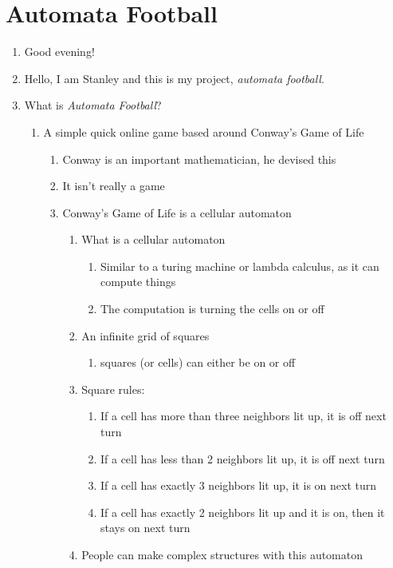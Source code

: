 \documentclass[11pt]{article}
\author{leeyman}
\date{\today}
\title{}
\begin{document}
\tableofcontents

\section{Automata Football}
\label{sec:org928f8e5}
\begin{enumerate}
\item Good evening!
\item Hello, I am Stanley and this is my project, \emph{automata football}.
\item What is \emph{Automata Football}?
\begin{enumerate}
\item A simple quick online game based around Conway's Game of Life
\begin{enumerate}
\item Conway is an important mathematician, he devised this
\item It isn't really a game
\item Conway's Game of Life is a cellular automaton
\begin{enumerate}
\item What is a cellular automaton
\begin{enumerate}
\item Similar to a turing machine or lambda calculus, as it can compute things
\item The computation is turning the cells on or off
\end{enumerate}
\item An infinite grid of squares
\begin{enumerate}
\item squares (or cells) can either be on or off
\end{enumerate}
\item Square rules:
\begin{enumerate}
\item If a cell has more than three neighbors lit up, it is off next turn
\item If a cell has less than 2 neighbors lit up, it is off next turn
\item If a cell has exactly 3 neighbors lit up, it is on next turn
\item If a cell has exactly 2 neighbors lit up and it is on, then it stays on next turn
\end{enumerate}
\item People can make complex structures with this automaton
\end{enumerate}
\end{enumerate}

\end{enumerate}
\end{enumerate}
\end{document}
